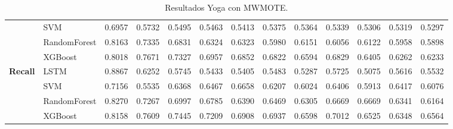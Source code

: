 \begin{table}[h]
\begin{adjustbox}{max width=15cm}
\begin{tabular}{|c|l|r|r|r|r|r|r|r|r|r|r|r|}
			& SVM &  0.6957 &  0.5732 &  0.5495 &  0.5463 &  0.5413 &  0.5375 &  0.5364 &  0.5339 &  0.5306 &  0.5319 &  0.5297 \\
			& RandomForest &  0.8163 &  0.7335 &  0.6831 &  0.6324 &  0.6323 &  0.5980 &  0.6151 &  0.6056 &  0.6122 &  0.5958 &  0.5898 \\
			& XGBoost &  0.8018 &  0.7671 &  0.7327 &  0.6957 &  0.6852 &  0.6822 &  0.6594 &  0.6829 &  0.6405 &  0.6262 &  0.6233 \\
			\hline
			\textbf{Recall} & LSTM &  0.8867 &  0.6252 &  0.5745 &  0.5433 &  0.5405 &  0.5483 &  0.5287 &  0.5725 &  0.5075 &  0.5616 &  0.5532 \\
			& SVM &  0.7156 &  0.5535 &  0.6368 &  0.6467 &  0.6658 &  0.6207 &  0.6024 &  0.6406 &  0.5913 &  0.6417 &  0.6076 \\
			& RandomForest &  0.8270 &  0.7267 &  0.6997 &  0.6785 &  0.6390 &  0.6469 &  0.6305 &  0.6669 &  0.6669 &  0.6341 &  0.6164 \\
			& XGBoost &  0.8158 &  0.7609 &  0.7445 &  0.7209 &  0.6908 &  0.6937 &  0.6598 &  0.7012 &  0.6525 &  0.6348 &  0.6564 \\
			\hline
		\end{tabular}
	\end{adjustbox}
	\caption{Resultados Yoga con MWMOTE.}
	\label{tab:Yoga_MWMOTE}
\end{table}

